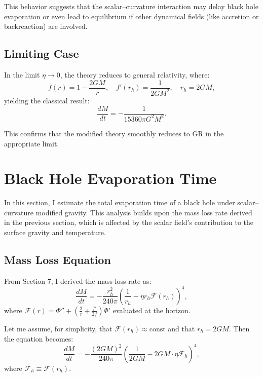 \documentclass[12pt]{article}
\begin{document}
This behavior suggests that the scalar--curvature interaction may delay black hole evaporation or even lead to equilibrium if other dynamical fields (like accretion or backreaction) are involved.

\subsection{Limiting Case}

In the limit \( \eta \to 0 \), the theory reduces to general relativity, where:
\[
f(r) = 1 - \frac{2GM}{r}, \quad f'(r_h) = \frac{1}{2GM^2}, \quad r_h = 2GM,
\]
yielding the classical result:
\begin{equation}
\frac{dM}{dt} = -\frac{1}{15360\pi G^2 M^2}.
\end{equation}

This confirms that the modified theory smoothly reduces to GR in the appropriate limit.

\section{Black Hole Evaporation Time}

In this section, I estimate the total evaporation time of a black hole under scalar--curvature modified gravity. This analysis builds upon the mass loss rate derived in the previous section, which is affected by the scalar field's contribution to the surface gravity and temperature.

\subsection{Mass Loss Equation}

From Section 7, I derived the mass loss rate as:
\begin{equation}
\frac{dM}{dt} = -\frac{r_h^2}{240\pi} \left( \frac{1}{r_h} - \eta r_h \mathcal{F}(r_h) \right)^4,
\label{eq:massloss_scalar}
\end{equation}
where \( \mathcal{F}(r) = \Phi'' + \left( \frac{2}{r} + \frac{f'}{2f} \right) \Phi' \) evaluated at the horizon.

Let me assume, for simplicity, that \( \mathcal{F}(r_h) \approx \text{const} \) and that \( r_h = 2GM \). Then the equation becomes:
\begin{equation}
\frac{dM}{dt} = -\frac{(2GM)^2}{240\pi} \left( \frac{1}{2GM} - 2GM \cdot \eta \mathcal{F}_h \right)^4,
\label{eq:simple_massloss}
\end{equation}
where \( \mathcal{F}_h \equiv \mathcal{F}(r_h) \).
\end{document}
